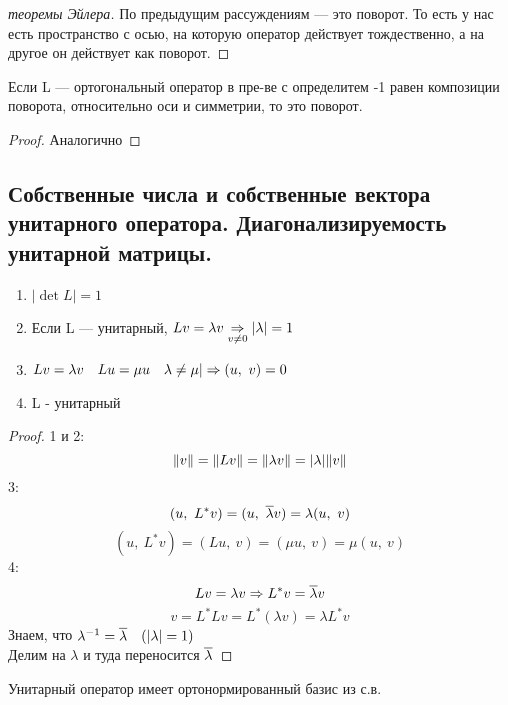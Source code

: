 \documentclass[main]{subfiles}
\begin{document}
\begin{proof}[теоремы Эйлера]
        По предыдущим рассуждениям --- это поворот. То есть у нас есть пространство с осью, на которую оператор действует тождественно, а на другое он действует как поворот.
    \end{proof}

    \begin{utv}
        Если L --- ортогональный оператор в пре-ве с определитем -1 равен композиции поворота, относительно оси и симметрии, то это поворот.
    \end{utv}

    \begin{proof}
        Аналогично
    \end{proof}

    \newpage
    \subsection{Собственные числа и собственные вектора унитарного оператора. Диагонализируемость унитарной матрицы.}

    \begin{utv}
		\begin{enumerate}
			\item $|\det L| = 1$
			\item Если L --- унитарный, $Lv = \lambda v \underset{v \neq 0}{\Rightarrow} |\lambda| = 1$
			\item $Lv = \lambda v \quad Lu = \mu u \quad \lambda \neq \mu | \Rightarrow (u,\ v) = 0$
            \item L - унитарный
		\end{enumerate}
	\end{utv}

	\begin{proof}
		1 и 2:
		\[\lVert v \rVert = \lVert Lv \rVert = \lVert \lambda v \rVert = |\lambda| \lVert v \rVert\]
		3:
		\[(u,\ L^* v) = (u,\ \ol{\lambda} v) = \lambda (u,\ v)\]
		\[(u,\ L^* v) = (Lu,\ v) = (\mu u,\ v) = \mu(u,\ v)\]
		4:
        \[Lv = \lambda v \Rightarrow L^* v = \overline{\lambda} v\]
		\[v = L^* L v = L^* (\lambda v) = \lambda L^* v\]
        Знаем, что $\lambda^{-1} = \overline{\lambda} \quad (|\lambda| = 1)$\\
		Делим на $\lambda$ и туда переносится $\overline{\lambda}$
	\end{proof}

    \begin{theorem}
        Унитарный оператор имеет ортонормированный базис из с.в.
    \end{theorem}
\end{document}
